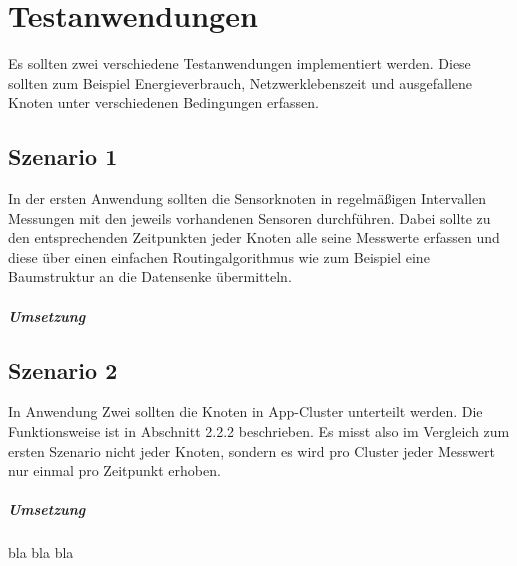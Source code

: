 \chapter{Testanwendungen}
Es sollten zwei verschiedene Testanwendungen implementiert werden. Diese sollten zum Beispiel Energieverbrauch, Netzwerklebenszeit und ausgefallene Knoten unter verschiedenen Bedingungen erfassen.\\
\section{Szenario 1}
In der ersten Anwendung sollten die Sensorknoten in regelmäßigen Intervallen Messungen mit den jeweils vorhandenen Sensoren durchführen. Dabei sollte zu den entsprechenden Zeitpunkten jeder Knoten alle seine Messwerte erfassen und diese über einen einfachen Routingalgorithmus wie zum Beispiel eine Baumstruktur an die Datensenke übermitteln.
\paragraph{Umsetzung}
\section{Szenario 2}
In Anwendung Zwei sollten die Knoten in App-Cluster unterteilt werden. Die Funktionsweise ist in Abschnitt 2.2.2 beschrieben. Es misst also im Vergleich zum ersten Szenario nicht jeder Knoten, sondern es wird pro Cluster jeder Messwert nur einmal pro Zeitpunkt erhoben.
\paragraph{Umsetzung}
bla bla bla